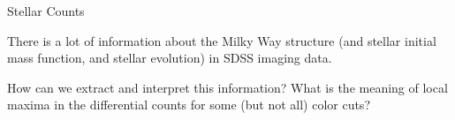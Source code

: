 \documentclass[letterpaper,landscape]{slides}
\begin{document}
\begin{slide}
\begin{center}
{\large \color{red} 
                    Stellar Counts
}
\end{center}


There is a lot of information about the Milky Way structure (and stellar
initial mass function, and stellar evolution) in SDSS imaging data.

{\color{blue} 
How can we extract and interpret this information? What is the meaning
of local maxima in the differential counts for some (but not all) color
cuts? 
}
 
    \begin{center}
        \begin{minipage}{7in}
            \phantom{x}  \hskip -1.5in 
           {}
         \end{minipage}
     \end{center}
 
    
\vfill
\end{slide}






\end{document}
